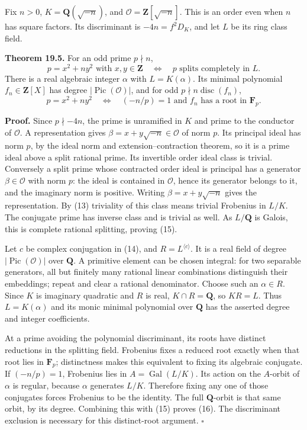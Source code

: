 \documentclass[11pt,a4paper]{article}
\begin{document}
Fix \(n>0\), \(K=\mathbf Q(\sqrt{-n})\), and
\(\mathcal O=\mathbf Z[\sqrt{-n}]\). This is an order even when \(n\)
has square factors. Its discriminant is \(-4n=f^2D_K\), and let \(L\) be
its ring class field.

\textbf{Theorem 19.5.} For an odd prime \(p\nmid n\), \[
p=x^2+ny^2\text{ with }x,y\in\mathbf Z
\quad\Longleftrightarrow\quad p\text{ splits completely in }L.
\tag{15}
\] There is a real algebraic integer \(\alpha\) with \(L=K(\alpha)\).
Its minimal polynomial \(f_n\in\mathbf Z[X]\) has degree
\(|\operatorname{Pic}(\mathcal O)|\), and for odd
\(p\nmid n\operatorname{disc}(f_n)\), \[
p=x^2+ny^2
\quad\Longleftrightarrow\quad
(-n/p)=1\text{ and }f_n\text{ has a root in }\mathbf F_p.
\tag{16}
\]

\textbf{Proof.} Since \(p\nmid-4n\), the prime is unramified in \(K\)
and prime to the conductor of \(\mathcal O\). A representation gives
\(\beta=x+y\sqrt{-n}\in\mathcal O\) of norm \(p\). Its principal ideal
has norm \(p\), by the ideal norm and extension--contraction theorem, so
it is a prime ideal above a split rational prime. Its invertible order
ideal class is trivial. Conversely a split prime whose contracted order
ideal is principal has a generator \(\beta\in\mathcal O\) with norm
\(p\): the ideal is contained in \(\mathcal O\), hence its generator
belongs to it, and the imaginary norm is positive. Writing
\(\beta=x+y\sqrt{-n}\) gives the representation. By (13) triviality of
this class means trivial Frobenius in \(L/K\). The conjugate prime has
inverse class and is trivial as well. As \(L/\mathbf Q\) is Galois, this
is complete rational splitting, proving (15).

Let \(c\) be complex conjugation in (14), and
\(R=L^{\langle c\rangle}\). It is a real field of degree
\(|\operatorname{Pic}(\mathcal O)|\) over \(\mathbf Q\). A primitive
element can be chosen integral: for two separable generators, all but
finitely many rational linear combinations distinguish their embeddings;
repeat and clear a rational denominator. Choose such an \(\alpha\in R\).
Since \(K\) is imaginary quadratic and \(R\) is real,
\(K\cap R=\mathbf Q\), so \(KR=L\). Thus \(L=K(\alpha)\) and its monic
minimal polynomial over \(\mathbf Q\) has the asserted degree and
integer coefficients.

At a prime avoiding the polynomial discriminant, its roots have distinct
reductions in the splitting field. Frobenius fixes a reduced root
exactly when that root lies in \(\mathbf F_p\); distinctness makes this
equivalent to fixing its algebraic conjugate. If \((-n/p)=1\), Frobenius
lies in \(A=\operatorname{Gal}(L/K)\). Its action on the \(A\)-orbit of
\(\alpha\) is regular, because \(\alpha\) generates \(L/K\). Therefore
fixing any one of those conjugates forces Frobenius to be the identity.
The full \(\mathbf Q\)-orbit is that same orbit, by its degree.
Combining this with (15) proves (16). The discriminant exclusion is
necessary for this distinct-root argument. \(\square\)
\end{document}
